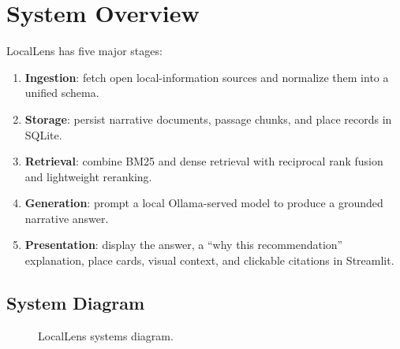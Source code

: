\documentclass[11pt]{article}
\begin{document}
\section{System Overview}
LocalLens has five major stages:
\begin{enumerate}[leftmargin=*]
    \item \textbf{Ingestion}: fetch open local-information sources and normalize them into a unified schema.
    \item \textbf{Storage}: persist narrative documents, passage chunks, and place records in SQLite.
    \item \textbf{Retrieval}: combine BM25 and dense retrieval with reciprocal rank fusion and lightweight reranking.
    \item \textbf{Generation}: prompt a local Ollama-served model to produce a grounded narrative answer.
    \item \textbf{Presentation}: display the answer, a ``why this recommendation'' explanation, place cards, visual context, and clickable citations in Streamlit.
\end{enumerate}

\subsection*{System Diagram}
\begin{figure}[h]
\centering
{}
\caption{LocalLens systems diagram.}
\end{figure}
\end{document}
